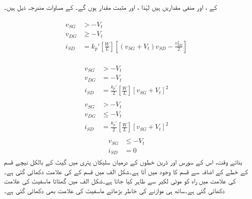  کے ،  اور  منفی مقداریں ہیں لہٰذا ،  اور  مثبت مقدار ہوں گے۔ کے مساوات مندرجہ ذیل ہیں۔

\begin{gather}
\begin{aligned} \label{مساوات_ماسفیٹ_جمع_غیر_افزائندہ_حدود_و_مساوات}
v_{SG}& >  -V_t \\
v_{DG}& \ge -V_t\\
i_{SD}&=k_p' \left[\frac{W}{L} \right ] \left[\left(v_{SG}+V_t \right )v_{SD}-\frac{v_{SD}^{2}}{2} \right ]
\end{aligned}
\end{gather}

\begin{gather}
\begin{aligned}
v_{SG}& > -V_t\\
v_{DG}&=-V_t\\
i_{SD}&=\frac{k_p'}{2} \left[\frac{W}{L} \right ] \left[v_{SG}+V_t \right]^{2} 
\end{aligned}
\end{gather}
\begin{gather}
\begin{aligned}\label{مساوات_ماسفیٹ_منفی_ماسفیٹ_افزائنہ_صورت_مثبت_متغیرات}
v_{SG}& > -V_t\\
v_{DG}& \le -V_t \\
i_{SD}&=\frac{k_p'}{2} \left[\frac{W}{L} \right ] \left[v_{SG}+V_t \right]^{2}
\end{aligned}
\end{gather}
\begin{gather}
\begin{aligned}
v_{SG}&\le  -V_t\\
i_{SD}&=0
\end{aligned}
\end{gather}
 بناتے وقت، اس کے سورس اور ڈرین خطوں کے درمیان سلیکان پتری میں گیٹ کے بالکل نیچے  قسم کے خطے کے اضافہ سے   قسم کا   وجود میں آتا ہے۔شکل  الف میں  قسم کے  کی علامت دکھائی گئی ہے۔ کی علامت میں راہ کو موٹی لکیر سے ظاہر کیا جاتا ہے۔شکل  الف میں  گھٹاتا ماسفیٹ کی علامت دکھائی گئی ہے۔ساتھ ہی موازنے کی خاطر  بڑھاتے ماسفیٹ کی علامت بھی دکھائی گئی ہے۔ 

